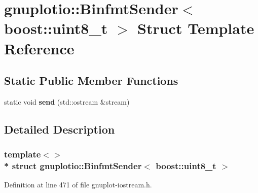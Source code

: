 \hypertarget{structgnuplotio_1_1_binfmt_sender_3_01boost_1_1uint8__t_01_4}{}\section{gnuplotio\+:\+:Binfmt\+Sender$<$ boost\+:\+:uint8\+\_\+t $>$ Struct Template Reference}
\label{structgnuplotio_1_1_binfmt_sender_3_01boost_1_1uint8__t_01_4}
\subsection*{Static Public Member Functions}
\begin{DoxyCompactItemize}
\item 
static void {\bfseries send} (std\+::ostream \&stream)\hypertarget{structgnuplotio_1_1_binfmt_sender_3_01boost_1_1uint8__t_01_4_a57d45c45f1ee19614c972bc82c4b214c}{}\label{structgnuplotio_1_1_binfmt_sender_3_01boost_1_1uint8__t_01_4_a57d45c45f1ee19614c972bc82c4b214c}

\end{DoxyCompactItemize}


\subsection{Detailed Description}
\subsubsection*{template$<$$>$\\*
struct gnuplotio\+::\+Binfmt\+Sender$<$ boost\+::uint8\+\_\+t $>$}



Definition at line 471 of file gnuplot-\/iostream.\+h.

